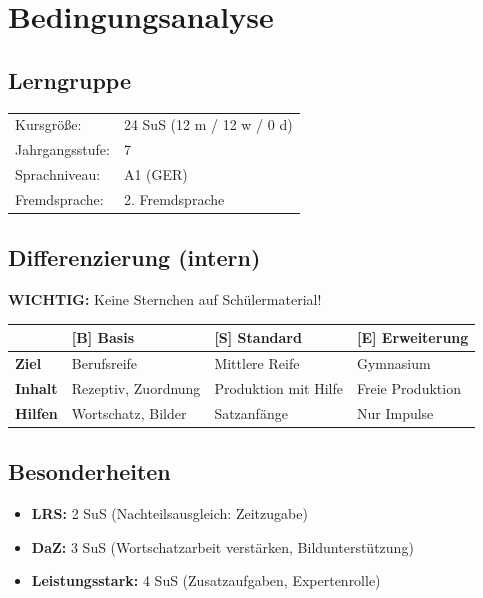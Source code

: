 \documentclass[11pt,a4paper]{article}
\newcommand{\jahrgangsstufe}{7}
\newcommand{\lerngruppengroesse}{24}
\newcommand{\maennlich}{12}
\newcommand{\weiblich}{12}
\newcommand{\divers}{0}
\newcommand{\gerniveau}{A1}
\begin{document}
\section{Bedingungsanalyse}

\subsection{Lerngruppe}
\begin{tabular}{ll}
    Kursgröße: & \lerngruppengroesse{} SuS (\maennlich{} m / \weiblich{} w / \divers{} d) \\
    Jahrgangsstufe: & \jahrgangsstufe \\
    Sprachniveau: & \gerniveau{} (GER) \\
    Fremdsprache: & 2. Fremdsprache \\
\end{tabular}

\subsection{Differenzierung (intern)}

\textbf{WICHTIG:} Keine Sternchen auf Schülermaterial!

\begin{tabular}{|l|p{4cm}|p{4cm}|p{4cm}|}
\hline
& \textbf{[B] Basis} & \textbf{[S] Standard} & \textbf{[E] Erweiterung} \\
\hline
\textbf{Ziel} & Berufsreife & Mittlere Reife & Gymnasium \\
\hline
\textbf{Inhalt} & Rezeptiv, Zuordnung & Produktion mit Hilfe & Freie Produktion \\
\hline
\textbf{Hilfen} & Wortschatz, Bilder & Satzanfänge & Nur Impulse \\
\hline
\end{tabular}

\subsection{Besonderheiten}
\begin{itemize}
    \item \textbf{LRS:} 2 SuS (Nachteilsausgleich: Zeitzugabe)
    \item \textbf{DaZ:} 3 SuS (Wortschatzarbeit verstärken, Bildunterstützung)
    \item \textbf{Leistungsstark:} 4 SuS (Zusatzaufgaben, Expertenrolle)
\end{itemize}
\end{document}
